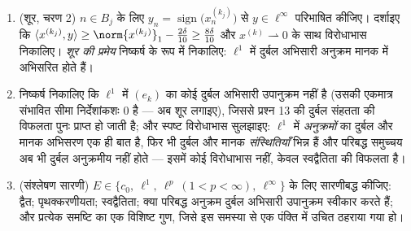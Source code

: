 \begin{problem}[{सप्ताहांत समस्या --- $(\ell^p)' = \ell^q$, स्वद्वैतिता, और
$\ell^\infty$ की विचित्रता}]
\begin{enumerate}[resume]
        $0 = N_0 < N_1 < N_2 < \cdots$ बनाइए कि $x^{(k_j)}$ का द्रव्यमान खंड $B_j =
        \intoc{N_{j-1}}{N_j}$ पर संकेंद्रित
        हो जाए:
        \[
        \sum_{n \in B_j}\bigl|x^{(k_j)}_n\bigr| \geq
        \norm{x^{(k_j)}}_1 - \frac\delta{10} .
        \]
  \item (शूर, चरण 2) $n \in
        B_j$ के लिए $y_n =
        \operatorname{sign}\bigl(x^{(k_j)}_n\bigr)$ से $y \in \ell^\infty$ परिभाषित कीजिए।
        दर्शाइए कि $\langle x^{(k_j)}, y\rangle \geq
        \norm{x^{(k_j)}}_1 - \frac{2\delta}{10} \geq
        \frac{8\delta}{10}$ और $x^{(k)} \rightharpoonup 0$ के साथ विरोधाभास निकालिए।
        \emph{शूर की प्रमेय} निष्कर्ष के रूप में निकालिए: $\ell^1$
        में दुर्बल अभिसारी अनुक्रम मानक में अभिसरित होते हैं।
  \item निष्कर्ष निकालिए कि $\ell^1$ में $(e_k)$ का कोई दुर्बल अभिसारी
        उपानुक्रम नहीं है (उसकी एकमात्र संभावित सीमा निर्देशांकशः
        $0$ है --- अब शूर लगाइए), जिससे प्रश्न 13 की दुर्बल
        संहतता की विफलता पुनः प्राप्त हो जाती है; और स्पष्ट
        विरोधाभास सुलझाइए: $\ell^1$ में \emph{अनुक्रमों} का दुर्बल
        और मानक अभिसरण एक ही बात है, फिर भी दुर्बल और मानक
        \emph{संस्थितियाँ} भिन्न हैं और परिबद्ध समुच्चय अब भी
        दुर्बल अनुक्रमीय  नहीं होते --- इसमें कोई विरोधाभास
        नहीं, केवल स्वद्वैतिता की विफलता है।
  \item (संश्लेषण सारणी) $E \in \{c_0,\ \ell^1,\ \ell^p\
        (1{<}p{<}\infty),\ \ell^\infty\}$ के लिए सारणीबद्ध कीजिए: द्वैत;
        पृथक्करणीयता; स्वद्वैतिता; क्या परिबद्ध अनुक्रम दुर्बल
        अभिसारी उपानुक्रम स्वीकार करते हैं; और प्रत्येक समष्टि
        का एक विशिष्ट गुण, जिसे इस समस्या से एक पंक्ति में उचित
        ठहराया गया हो।
\end{enumerate}


\end{problem}
